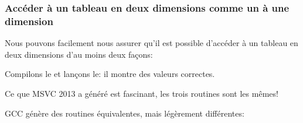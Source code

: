 ﻿\subsubsection{Accéder à un tableau en deux dimensions comme un à une dimension}

Nous pouvons facilement nous assurer qu'il est possible d'accéder à un tableau en
deux dimensions d'au moins deux façons:



Compilons le et lançons le: il montre des valeurs correctes.

Ce que MSVC 2013 a généré est fascinant, les trois routines sont les mêmes!



GCC génère des routines équivalentes, mais légèrement différentes:



